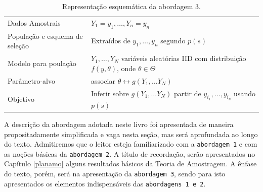 \documentclass[]{book}
\theoremstyle{definition}
\theoremstyle{definition}
\theoremstyle{definition}
\theoremstyle{remark}
\begin{document}
\begin{longtable}[]{@{}ll@{}}
\caption{\label{tab:modelsuperpop} Representação esquemática da abordagem
3.}\tabularnewline
\toprule
\begin{minipage}[t]{0.29\columnwidth}\raggedright\strut
Dados Amostrais\strut
\end{minipage} & \begin{minipage}[t]{0.60\columnwidth}\raggedright\strut
\(Y_1=y_1,\ldots, Y_n=y_n\)\strut
\end{minipage}\tabularnewline
\begin{minipage}[t]{0.29\columnwidth}\raggedright\strut
População e esquema de seleção\strut
\end{minipage} & \begin{minipage}[t]{0.60\columnwidth}\raggedright\strut
Extraídos de \(y_1,\dots,y_n\) segundo \(p(s)\)\strut
\end{minipage}\tabularnewline
\begin{minipage}[t]{0.29\columnwidth}\raggedright\strut
Modelo para poulação\strut
\end{minipage} & \begin{minipage}[t]{0.60\columnwidth}\raggedright\strut
\(Y_1,\dots,Y_N\) variáveis aleatórias IID com distribuição
\(f(y,\theta)\), onde \(\theta \in \Theta\)\strut
\end{minipage}\tabularnewline
\begin{minipage}[t]{0.29\columnwidth}\raggedright\strut
Parâmetro-alvo\strut
\end{minipage} & \begin{minipage}[t]{0.60\columnwidth}\raggedright\strut
associar
\(\theta \longleftrightarrow g\left(Y_{1},\ldots Y_{N}\right)\)\strut
\end{minipage}\tabularnewline
\begin{minipage}[t]{0.29\columnwidth}\raggedright\strut
Objetivo\strut
\end{minipage} & \begin{minipage}[t]{0.60\columnwidth}\raggedright\strut
Inferir sobre \(g\left( Y_{1},\ldots Y_{N}\right)\) partir de
\(y_{i_1},\ldots ,y_{i_n}\) usando \(p\left( s\right)\)\strut
\end{minipage}\tabularnewline
\bottomrule
\end{longtable}

A descrição da abordagem adotada neste livro foi apresentada de maneira
propositadamente simplificada e vaga nesta seção, mas será aprofundada
ao longo do texto. Admitiremos que o leitor esteja familiarizado com a
\texttt{abordagem\ 1} e com as noções básicas da \texttt{abordagem\ 2}.
A título de recordação, serão apresentados no Capítulo \ref{planamo}
alguns resultados básicos da Teoria de Amostragem. A ênfase do texto,
porém, será na apresentação da \texttt{abordagem\ 3}, sendo para isto
apresentados os elementos indispensáveis das
\texttt{abordagens\ 1\ e\ 2}.
\end{document}
